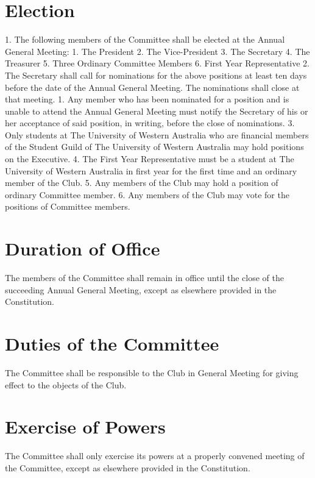 \documentclass[12pt]{article} %
\begin{document}
\section{Election}
1. The following members of the Committee shall be elected at the Annual General
Meeting:
1. The President
2. The Vice-President
3. The Secretary
4. The Treasurer
5. Three Ordinary Committee Members
6. First Year Representative
2. The Secretary shall call for nominations for the above positions at least ten days
before the date of the Annual General Meeting. The nominations shall close at that
meeting.
1. Any member who has been nominated for a position and is unable to attend
the Annual General Meeting must notify the Secretary of his or her
acceptance of said position, in writing, before the close of nominations.
3. Only students at The University of Western Australia who are financial members of
the Student Guild of The University of Western Australia may hold positions on the
Executive.
4. The First Year Representative must be a student at The University of Western
Australia in first year for the first time and an ordinary member of the Club.
5. Any members of the Club may hold a position of ordinary Committee member.
6. Any members of the Club may vote for the positions of Committee members.

\section{Duration of Office}
The members of the Committee shall remain in office until the close of the succeeding
Annual General Meeting, except as elsewhere provided in the Constitution.

\section{Duties of the Committee}
The Committee shall be responsible to the Club in General Meeting for giving effect to the
objects of the Club.

\section{Exercise of Powers}
The Committee shall only exercise its powers at a properly convened meeting of the
Committee, except as elsewhere provided in the Constitution.
\end{document}
